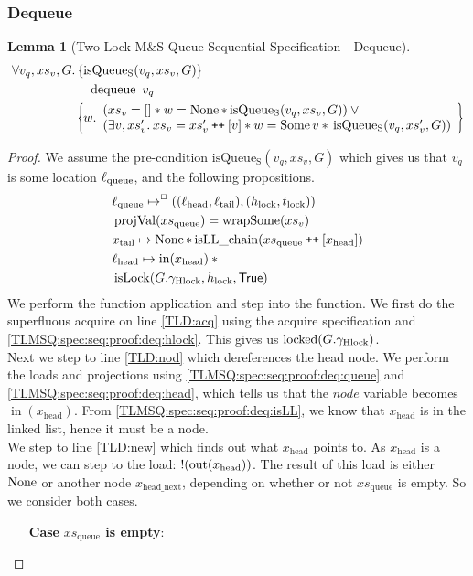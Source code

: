 \documentclass[a4paper, 10pt]{report}
\theoremstyle{definition}
\newtheorem{lemma}[theorem]{Lemma}
\newcommand{\isLock}{\operatorname{isLock}}
\newcommand{\locked}{\operatorname{locked}}
\newcommand{\dequeue}{\operatorname{dequeue}}
\newcommand{\msq}{M\&S Queue}
\newcommand{\tlmsq}{Two-Lock \msq{}}
\newcommand{\isqueueseq}{\operatorname{isQueue_{S}}}
\newcommand{\vq}{v_q}
\newcommand{\xsqueue}{xs_{\mathrm{queue}}}
\newcommand{\isLLchain}{\operatorname{isLL\_chain}}
\newcommand{\projval}{\operatorname{projVal}}
\newcommand{\wrapsome}{\operatorname{wrapSome}}
\newcommand{\locN}[1]{\loc_{\mathrm{#1}}}
\newcommand{\lochead}{\locN{head}}
\newcommand{\loctail}{\locN{tail}}
\newcommand{\locqueue}{\locN{queue}}
\newcommand{\nodeval}{\valB}
\newcommand{\nIn}[1]{\operatorname{in}(#1)}
\newcommand{\nOut}[1]{\operatorname{out}(#1)}
\newcommand{\node}{x}
\newcommand{\nodeN}[1]{\node_{\mathrm{#1}}}
\newcommand{\nodehead}{\nodeN{head}}
\newcommand{\nodetail}{\nodeN{tail}}
\newcommand{\nodeheadnext}{\nodeN{head\_next}}
\newcommand{\absvalue}{\val}
\newcommand{\absvalueList}{xs_v}
\newcommand{\Hlock}{h_{\mathrm{lock}}}
\newcommand{\Tlock}{t_{\mathrm{lock}}}
\newcommand{\Qg}{G}
\newcommand{\ghlock}{\gname_{\mathrm{Hlock}}}
\newcommand\catenate{\mathbin{\text{\ttfamily\upshape ++}}}
\newcommand{\seqspecdeqHT}[3]{\hoareV[t]{\isqueueseq(#1, #2, #3)}{\dequeue \ #1}{\nodeval . \begin{array}{l}(#2 = [] \star{} \nodeval = \None \star{} \isqueueseq(#1, #2, #3)) \lor{}\\ (\Exists \absvalue, #2' . #2 = #2' \catenate [\absvalue] \star{} \nodeval = \Some \absvalue \star{} \isqueueseq(#1, #2', #3)) \end{array}}}
\newcommand{\seqspecdeqGen}[3]{\All #1, #2, #3. \seqspecdeqHT{#1}{#2}{#3}}
\newcommand{\seqspecdeq}{\seqspecdeqGen{\vq}{\absvalueList}{\Qg}}
\begin{document}
\subsubsection{Dequeue}
\begin{lemma}[\tlmsq{} Sequential Specification - Dequeue]\label{TLMSQ:spec:seq:dequeue}
  \begin{equation*}
    \seqspecdeq
  \end{equation*}
\end{lemma}
\begin{proof}
We assume the pre-condition $\isqueueseq(\vq, \absvalueList, \Qg)$ which gives us that $\vq$ is some location $\locqueue$, and the following propositions.
\begin{align}
  &\locqueue \mapsto^{\persistently} ((\lochead, \loctail), (\Hlock, \Tlock))\label{TLMSQ:spec:seq:proof:deq:queue}\\
  &\projval(\xsqueue) = \wrapsome(\absvalueList)\label{TLMSQ:spec:seq:proof:deq:rel}\\
  &\nodetail \mapsto \None \star{} \isLLchain (\xsqueue \catenate [\nodehead])\label{TLMSQ:spec:seq:proof:deq:isLL}\\
  &\lochead \mapsto \nIn{\nodehead} \star{}\label{TLMSQ:spec:seq:proof:deq:head}\\
  &\isLock(\Qg.\ghlock, \Hlock, \TRUE)\label{TLMSQ:spec:seq:proof:deq:hlock}
\end{align}
We perform the function application and step into the function. We first do the superfluous acquire on line \ref{TLD:acq} using the acquire specification and \ref{TLMSQ:spec:seq:proof:deq:hlock}. This gives us $\locked(\Qg.\ghlock)$.\\
Next we step to line \ref{TLD:nod} which dereferences the head node. We perform the loads and projections using \ref{TLMSQ:spec:seq:proof:deq:queue} and \ref*{TLMSQ:spec:seq:proof:deq:head}, which tells us that the $node$ variable becomes $\nIn{\nodehead}$. From \ref{TLMSQ:spec:seq:proof:deq:isLL}, we know that $\nodehead$ is in the linked list, hence it must be a node.\\
We step to line \ref{TLD:new} which finds out what $\nodehead$ points to. As $\nodehead$ is a node, we can step to the load: $\deref (\nOut{\nodehead})$. The result of this load is either $\operatorname{None}$ or another node $\nodeheadnext$, depending on whether or not $\xsqueue$ is empty. So we consider both cases.
\begin{itemize}
  \item[\textbf{Case}] \textbf{$\xsqueue$ is empty}:

\end{itemize}
\end{proof}
\end{document}
